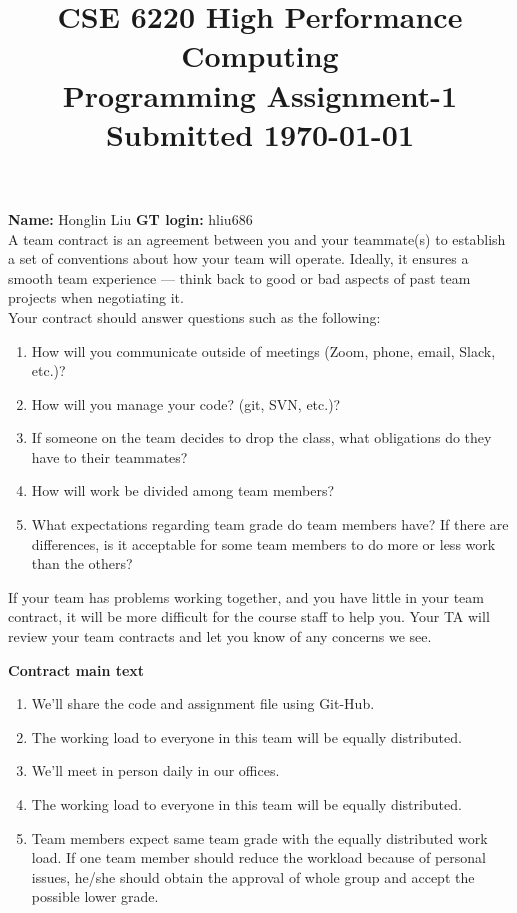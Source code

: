 \documentclass[11pt]{article}
\begin{document}
\title{\large\bf \vspace*{-0.3in}CSE 6220 High Performance Computing\\
Programming Assignment-1 \\Submitted \today}
\author{}
\date{}
\maketitle
\vspace*{-0.8in}
{\bf Name:} Honglin Liu \hfill{{\bf GT login:} hliu686}\\

A team contract is an agreement between you and your teammate(s) to establish a set of conventions about how your team will operate. 
Ideally, it ensures a smooth team experience — think back to good or bad aspects of past team projects when negotiating it.\\

Your contract should answer questions such as the following:
\begin{enumerate}
	\item How will you communicate outside of meetings (Zoom, phone, email, Slack, etc.)?
	\item How will you manage your code? (git, SVN, etc.)?
	\item If someone on the team decides to drop the class, what obligations do they have to their teammates?
	\item How will work be divided among team members?
	\item What expectations regarding team grade do team members have? If there are differences, is it acceptable for some team members to do more or less work than the others?
\end{enumerate}

If your team has problems working together, and you have little in your team contract, it will be more difficult for the course staff to help you. Your TA will review your team contracts and let you know of any concerns we see.


\newpage
\textbf{Contract main text}
\begin{enumerate}
	\item We'll share the code and assignment file using Git-Hub.
 	\item The working load to everyone in this team will be equally distributed.
  	\item We'll meet in person daily in our offices.
    	\item The working load to everyone in this team will be equally distributed.
 	\item Team members expect same team grade with the equally distributed work load. If one team member should reduce the workload because of personal issues, he/she should obtain the approval of whole group and accept the possible lower grade.
\end{enumerate}
\end{document}
